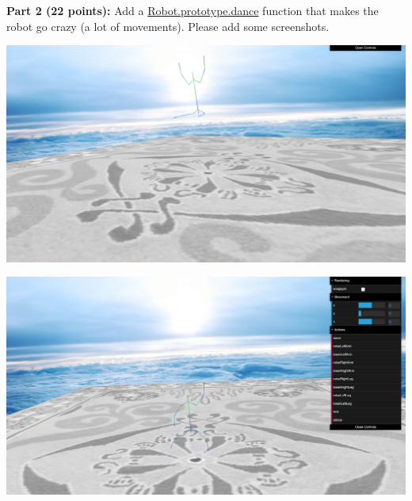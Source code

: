 \documentclass[10pt,oneside,onecolumn,letterpaper]{article}
\begin{document}
\vspace{.5cm}

\noindent\textbf{Part 2 (22 points):} Add a \url{Robot.prototype.dance} function that makes the robot go crazy (a lot of movements). Please add some screenshots.


\vspace{.5cm}

\begin{center}
\includegraphics[width=.7\textwidth]{gfx/screenshot-2-dance.png}
\end{center}


\begin{center}
\includegraphics[width=.7\textwidth]{gfx/screenshot-3-dance.png}
\end{center}

\vspace{.5cm}
\end{document}
